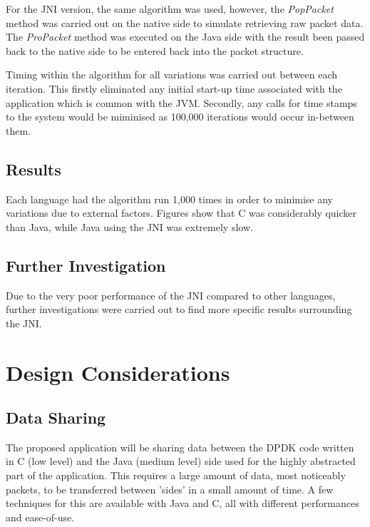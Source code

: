 \documentclass[final_report.tex]{subfiles}
\begin{document}
For the JNI version, the same algorithm was used, however, the \textit{PopPacket} method was carried out on the native side to simulate retrieving raw packet data. The \textit{ProPacket} method was executed on the Java side with the result been passed back to the native side to be entered back into the packet structure.

Timing within the algorithm for all variations was carried out between each iteration. This firstly eliminated any initial start-up time associated with the application which is common with the JVM. Secondly, any calls for time stamps to the system would be miminised as 100,000 iterations would occur in-between them.

\subsection{Results}
Each language had the algorithm run 1,000 times in order to minimise any variations due to external factors. Figures  show that C was considerably quicker than Java, while Java using the JNI was extremely slow. 

\subsection{Further Investigation}
Due to the very poor performance of the JNI compared to other languages, further investigations were carried out to find more specific results surrounding the JNI.

\section{Design Considerations}
\subsection{Data Sharing}
The proposed application will be sharing data between the DPDK code written in C (low level) and the Java (medium level) side used for the highly abstracted part of the application. This requires a large amount of data, most noticeably packets, to be transferred between 'sides' in a small amount of time.
A few techniques for this are available with Java and C, all with different performances and ease-of-use.
\end{document}

